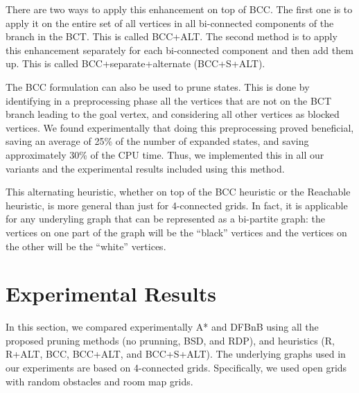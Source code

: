 \documentclass[letterpaper]{article} %
\newcommand\Yossi[1]{\nb{\textbf{Yossi:}}{green}{#1}}
\newcommand\Roni[1]{\nb{\textbf{Roni:}}{blue}{#1}}
\begin{document}
There are two ways to apply this enhancement on top of BCC. The first one is to apply it on the entire set of all vertices in all bi-connected components of the branch in the BCT. This is called BCC+ALT.
The second method is to apply this enhancement separately for each bi-connected component and then add them up. This is called BCC+separate+alternate (BCC+S+ALT).




The BCC formulation can also be used to prune states. This is done by identifying in a preprocessing phase all the vertices that are not on the BCT branch leading to the goal vertex,
and considering all other vertices as blocked vertices. We found experimentally that doing this preprocessing proved beneficial, saving an average of 25\% of the number of expanded states, and saving approximately 30\% of the CPU time. Thus, we implemented this in all our variants and the experimental results included using this  method. %



This alternating heuristic, whether on top of the BCC heuristic or the Reachable heuristic, is more general than just for 4-connected grids. In fact, it is applicable for any underyling graph that can be represented as a bi-partite graph: the vertices on one part of the graph will be the ``black'' vertices and the vertices on the other will be the ``white'' vertices.


\section{Experimental Results}
\label{sec:experimental}
In this section, we compared experimentally
A* and DFBnB using all the proposed pruning methods (no prunning, BSD, and RDP),
and heuristics (R, R+ALT, BCC, BCC+ALT, and BCC+S+ALT).
The underlying graphs used in our experiments are based on 4-connected grids.
Specifically, we used open grids with random obstacles and room map grids.
\end{document}
